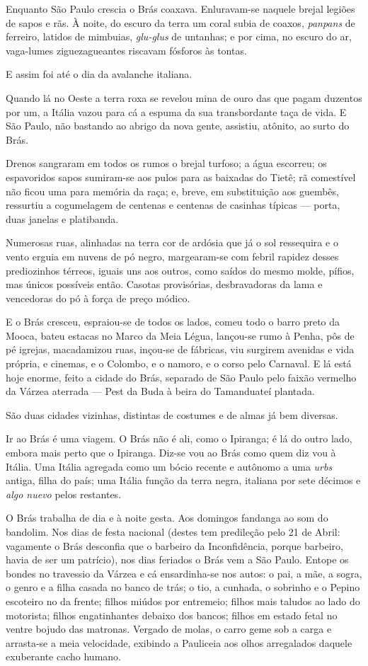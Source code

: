 Enquanto São Paulo crescia o Brás coaxava. Enluravam-se naquele brejal
legiões de sapos e rãs. À noite, do escuro da terra um coral subia de
coaxos, \emph{panpans} de ferreiro, latidos de mimbuias, \emph{glu-glus}
de untanhas; e por cima, no escuro do ar, vaga-lumes ziguezagueantes
riscavam fósforos às tontas.

E assim foi até o dia da avalanche italiana.

Quando lá no Oeste a terra roxa se revelou mina de ouro das que pagam
duzentos por um, a Itália vazou para cá a espuma da sua transbordante
taça de vida. E São Paulo, não bastando ao abrigo da nova gente,
assistiu, atônito, ao surto do Brás.

Drenos sangraram em todos os rumos o brejal turfoso; a água escorreu; os
espavoridos sapos sumiram-se aos pulos para as baixadas do Tietê; rã
comestível não ficou uma para memória da raça; e, breve, em substituição
aos guembês, ressurtiu a cogumelagem de centenas e centenas de casinhas
típicas --- porta, duas janelas e platibanda.

Numerosas ruas, alinhadas na terra cor de ardósia que já o sol
ressequira e o vento erguia em nuvens de pó negro, margearam-se com
febril rapidez desses prediozinhos térreos, iguais uns aos outros, como
saídos do mesmo molde, pífios, mas únicos possíveis então. Casotas
provisórias, desbravadoras da lama e vencedoras do pó à força de preço
módico.

E o Brás cresceu, espraiou-se de todos os lados, comeu todo o barro
preto da Mooca, bateu estacas no Marco da Meia Légua, lançou-se rumo à
Penha, pôs de pé igrejas, macadamizou ruas, inçou-se de fábricas, viu
surgirem avenidas e vida própria, e cinemas, e o Colombo, e o namoro, e
o corso pelo Carnaval. E lá está hoje enorme, feito a cidade do Brás,
separado de São Paulo pelo faixão vermelho da Várzea aterrada --- Pest
da Buda à beira do Tamanduateí plantada.

São duas cidades vizinhas, distintas de costumes e de almas já bem
diversas.

Ir ao Brás é uma viagem. O Brás não é ali, como o Ipiranga; é lá do
outro lado, embora mais perto que o Ipiranga. Diz-se vou ao Brás como
quem diz vou à Itália. Uma Itália agregada como um bócio recente e
autônomo a uma \emph{urbs} antiga, filha do país; uma Itália função da
terra negra, italiana por sete décimos e \emph{algo nuevo} pelos
restantes.

O Brás trabalha de dia e à noite gesta. Aos domingos fandanga ao som do
bandolim. Nos dias de festa nacional (destes tem predileção pelo 21 de
Abril: vagamente o Brás desconfia que o barbeiro da Inconfidência,
porque barbeiro, havia de ser um patrício), nos dias feriados o Brás vem
a São Paulo. Entope os bondes no travessio da Várzea e cá ensardinha-se
nos autos: o pai, a mãe, a sogra, o genro e a filha casada no banco de
trás; o tio, a cunhada, o sobrinho e o Pepino escoteiro no da frente;
filhos miúdos por entremeio; filhos mais taludos ao lado do motorista;
filhos engatinhantes debaixo dos bancos; filhos em estado fetal no
ventre bojudo das matronas. Vergado de molas, o carro geme sob a carga e
arrasta-se a meia velocidade, exibindo a Pauliceia aos olhos arregalados
daquele exuberante cacho humano.

